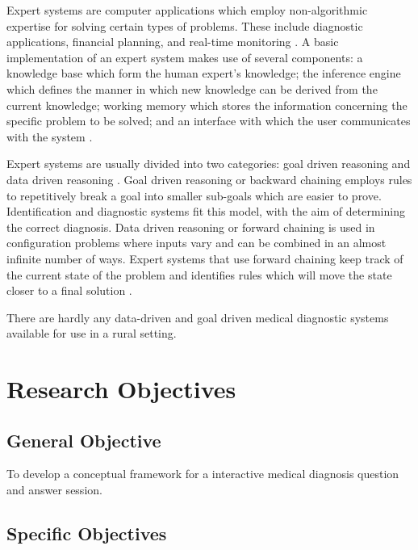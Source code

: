 Expert systems are computer applications which employ non-algorithmic expertise for solving certain types of problems.
 These include diagnostic applications, financial planning, and real-time monitoring \cite{Merritt:2010}.
A basic implementation of an expert system makes use of several components:
a knowledge base which form the human expert's knowledge; 
the inference engine which defines the manner in which new knowledge can be derived from the current knowledge; 
working memory which stores the information concerning the specific problem to be solved; 
and an interface with which the user communicates with the system \cite{Agarwal:2014}. 

Expert systems are usually divided into two categories: goal driven reasoning and data driven reasoning \cite{Merritt:2010}. 
Goal driven reasoning or backward chaining employs rules to repetitively break a goal into smaller sub-goals which are easier to prove. 
Identification and diagnostic systems fit this model, with the aim of determining the correct diagnosis. 
Data driven reasoning or forward chaining is used in configuration problems where inputs vary and can be combined in an almost infinite number of ways. 
Expert systems that use forward chaining keep track of the current state of the problem and identifies rules which will move the state closer to a final solution .

There are hardly any data-driven and goal driven medical diagnostic systems available for use in a rural setting.

\section{Research Objectives}
\label{sec:researchobjectives}

\subsection{General Objective}
\label{sec:generalobjective}

To develop a conceptual framework for a interactive medical diagnosis question and answer session.

\subsection{Specific Objectives}
\label{sec:specificobjectives}

